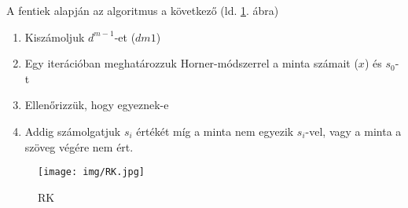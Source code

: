 \documentclass[margin=0px]{article}
\begin{document}
			A fentiek alapján az algoritmus a következő (ld. \ref{fig:RK}. ábra)
			\begin{enumerate}
				\item Kiszámoljuk $d^{m-1}$-et ($dm1$)
				\item Egy iterációban meghatározzuk Horner-módszerrel a minta számait ($x$) és $s_0$-t
				\item Ellenőrizzük, hogy egyeznek-e
				\item Addig számolgatjuk $s_i$ értékét míg a minta nem egyezik $s_i$-vel, vagy a minta a szöveg végére nem ért.
			\end{enumerate}
			\begin{figure}[H]
				\centering
				\texttt{[image: img/RK.jpg]}
				\caption{RK}
				\label{fig:RK}
			\end{figure}
\end{document}
